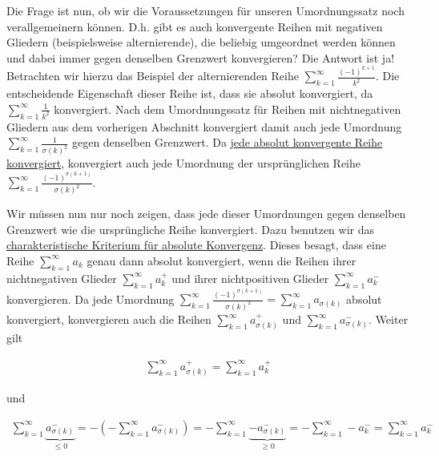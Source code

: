 \documentclass[fontsize=9pt,
               parskip=half-,
               DIV=14,
               listof=chapterentry,
               tocflat]{scrbook}
\begin{document}
Die Frage ist nun, ob wir die Voraussetzungen für unseren Umordnungssatz noch verallgemeinern können. D.h. gibt es auch konvergente Reihen mit negativen Gliedern (beispielsweise alternierende), die beliebig umgeordnet werden können und dabei immer gegen denselben Grenzwert konvergieren? Die Antwort ist ja! Betrachten wir hierzu das Beispiel der alternierenden Reihe $\sum _{k=1}^{\infty }{\tfrac {(-1)^{k+1}}{k^{2}}}$. Die entscheidende Eigenschaft dieser Reihe ist, dass sie absolut konvergiert, da $\sum _{k=1}^{\infty }{\tfrac {1}{k^{2}}}$ konvergiert. Nach dem Umordnungssatz für Reihen mit nichtnegativen Gliedern aus dem vorherigen Abschnitt konvergiert damit auch jede Umordnung $\sum _{k=1}^{\infty }{\tfrac {1}{\sigma (k)^{2}}}$ gegen denselben Grenzwert. Da \href{https://de.wikibooks.org/wiki/Mathe\_für\_Nicht-Freaks:\_Absolute\_Konvergenz\_einer\_Reihe\#Anker:absolute\_Konvergenz\_und\_Konvergenz}
{jede absolut konvergente Reihe konvergiert}, konvergiert auch jede Umordnung der ursprünglichen Reihe $\sum _{k=1}^{\infty }{\tfrac {(-1)^{\sigma (k+1)}}{\sigma (k)^{2}}}$.

Wir müssen nun nur noch zeigen, dass jede dieser Umordnungen gegen denselben Grenzwert wie die ursprüngliche Reihe konvergiert. Dazu benutzen wir das \href{https://de.wikibooks.org/wiki/Mathe\_für\_Nicht-Freaks:\_Absolute\_Konvergenz\_einer\_Reihe\#Anker:Kriterium\_absolute\_Konvergenz}
{charakteristische Kriterium für absolute Konvergenz}. Dieses besagt, dass eine Reihe $\sum _{k=1}^{\infty }a_{k}$ genau dann absolut konvergiert, wenn die Reihen ihrer nichtnegativen Glieder $\sum _{k=1}^{\infty }a_{k}^{+}$ und ihrer nichtpositiven Glieder $\sum _{k=1}^{\infty }a_{k}^{-}$ konvergieren. Da jede Umordnung $\sum _{k=1}^{\infty }{\tfrac {(-1)^{\sigma (k+1)}}{\sigma (k)^{2}}}=\sum _{k=1}^{\infty }a_{\sigma (k)}$ absolut konvergiert, konvergieren auch die Reihen $\sum _{k=1}^{\infty }a_{\sigma (k)}^{+}$ und $\sum _{k=1}^{\infty }a_{\sigma (k)}^{-}$. Weiter gilt

\begin{align*}
\sum _{k=1}^{\infty }a_{\sigma (k)}^{+}=\sum _{k=1}^{\infty }a_{k}^{+}
\end{align*}

und

\begin{align*}
\sum _{k=1}^{\infty }\underbrace {a_{\sigma (k)}^{-}} _{\leq 0}=-\left(-\sum _{k=1}^{\infty }a_{\sigma (k)}^{-}\right)=-\sum _{k=1}^{\infty }\underbrace {-a_{\sigma (k)}^{-}} _{\geq 0}=-\sum _{k=1}^{\infty }-a_{k}^{-}=\sum _{k=1}^{\infty }a_{k}^{-}
\end{align*}
\end{document}
